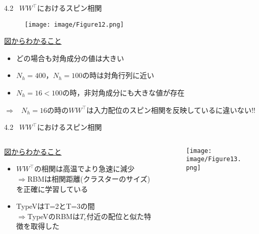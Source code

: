 \documentclass[dvipdfmx,8pt]{beamer}
\begin{document}
\begin{frame}[t]{4.2 \ $WW^{\top}$におけるスピン相関}
  \begin{figure}
    \begin{center}
      \texttt{[image: image/Figure12.png]}
    \end{center}
  \end{figure}
  \underline{図からわかること}
  \vspace{0.2cm}
  \begin{itemize}
    \item どの場合も対角成分の値は大きい
    \item $N_h=400$，$N_h=100$の時は対角行列に近い
    \item $N_h=16 < 100$の時，非対角成分にも大きな値が存在
  \end{itemize}
  \vspace{0.3cm}
  $\Rightarrow$ \ $N_h=16$の時の$WW^{\top}$は入力配位のスピン相関を反映しているに違いない!!
\end{frame}

\begin{frame}{4.2 \ $WW^{\top}$におけるスピン相関}
  \begin{columns}
     \begin{column}{0.4\textwidth}
      \underline{図からわかること}
      \vspace{0.2cm}
      \begin{itemize}
        \item $WW^{\top}$の相関は高温でより急速に減少\\
        $\Rightarrow$RBMは相関距離(クラスターのサイズ)を正確に学習している
        \vspace{0.5cm}
        \item TypeVはT=2とT=3の間\\
        $\Rightarrow$TypeVのRBMは$T_c$付近の配位と似た特徴を取得した
      \end{itemize}
     \end{column}
     \begin{column}{0.6\textwidth}
      \begin{figure}
        \begin{center}
          \texttt{[image: image/Figure13.png]}
        \end{center}
      \end{figure}
     \end{column}
  \end{columns}
\end{frame}
\end{document}
